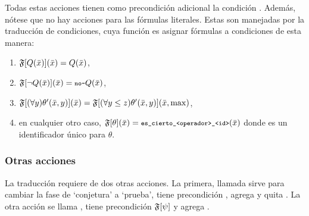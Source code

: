 Todas estas acciones tienen como precondición adicional la condición
. Además, nótese que no hay acciones para las fórmulas literales.
Estas son manejadas por la traducción de condiciones, cuya función es asignar
fórmulas a condiciones de esta manera:
\begin{enumerate}[--]
\item $\mathfrak{F}[Q(\bar x)](\bar x)=Q(\bar x)$,
\item $\mathfrak{F}[\neg Q(\bar x)](\bar x)={\texttt{\footnotesize no-}}Q(\bar x)$,
\item $\mathfrak{F}[(\forall y)\theta'(\bar x,y)](\bar x) =
  \mathfrak{F}[(\forall y\leq z)\theta'(\bar x,y)](\bar x,\max)$,
\item en cualquier otro caso, $\mathfrak{F}[\theta](\bar x)={\texttt{\footnotesize es\_cierto\_<operador>\_<id>}}(\bar x)$
  donde  es un identificador único para $\theta$.
\end{enumerate}

\subsubsection{Otras acciones}
La traducción requiere de dos otras acciones. La primera,
llamada  sirve para cambiar la fase de
`conjetura' a `prueba', tiene precondición , agrega
 y quita . La otra acción se llama
, tiene precondición $\mathfrak{F}[\psi]$ y agrega 
.


